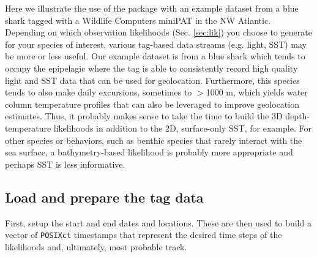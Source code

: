 \documentclass{article}\usepackage[]{graphicx}\usepackage[]{color}
\begin{document}
Here we illustrate the use of the package with an example dataset from a blue shark tagged with a Wildlife Computers miniPAT in the NW Atlantic. Depending on which observation likelihoods (Sec. \ref{sec:lik}) you choose to generate for your species of interest, various tag-based data streams (e.g. light, SST) may be more or less useful. Our example dataset is from a blue shark which tends to occupy the epipelagic where the tag is able to consistently record high quality light and SST data that can be used for geolocation. Furthermore, this species tends to also make daily excursions, sometimes to $>$1000 m, which yields water column temperature profiles that can also be leveraged to improve geolocation estimates. Thus, it probably makes sense to take the time to build the 3D depth-temperature likelihoods in addition to the 2D, surface-only SST, for example. For other species or behaviors, such as benthic species that rarely interact with the sea surface, a bathymetry-based likelihood is probably more appropriate and perhaps SST is less informative.

\subsection{Load and prepare the tag data} \label{sec:tag-data}

First, setup the start and end dates and locations. These are then used to build a vector of \texttt{POSIXct} timestamps that represent the desired time steps of the likelihoods and, ultimately, most probable track.
\end{document}

